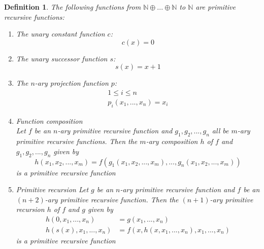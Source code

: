 \documentclass[12pt, letterpaper]{article}
\newtheorem*{definition}{Definition}
\theoremstyle{case}
\begin{document}
    \begin{definition}
      The following functions from $\mathbb{N} \oplus ... \oplus \mathbb{N}$ to $\mathbb{N}$
      are primitive recursive functions:
      \begin{enumerate}
        \item The unary constant function $c$:
        \begin{equation*}
          c(x) = 0
        \end{equation*}
        \item The unary successor function $s$:
        \begin{equation*}
          s(x) = x + 1
        \end{equation*}
        \item The $n$-ary projection function $p$:
        \begin{equation*}
          \begin{gathered}
            1 \leq i \leq n
            \\
            p_i(x_1, ..., x_n) = x_i
          \end{gathered}
        \end{equation*}
        \item Function composition \\
        Let $f$ be an $n$-ary primitive recursive function and $g_1, g_2, ..., g_n$ all be $m$-ary
        primitive recursive functions. Then the $m$-ary composition $h$ of $f$ and $g_1, g_2, ..., g_n$ given by
        \begin{equation*}
          h(x_1, x_2, ..., x_m) = f(g_1(x_1, x_2, ..., x_m), ..., g_n(x_1, x_2, ..., x_m))
        \end{equation*}
        is a primitive recursive function
        \item Primitive recursion
        Let $g$ be an $n$-ary primitive recursive function and $f$ be an $(n + 2)$-ary primitive recursive
        function. Then the $(n + 1)$-ary primitive recursion $h$ of $f$ and $g$ given by
        \begin{equation*}
          \begin{aligned}
            h(0, x_1, ..., x_n) &= g(x_1, ..., x_n)
            \\
            h(s(x), x_1, ..., x_n) &= f(x, h(x, x_1, ..., x_n), x_1, ..., x_n)
          \end{aligned}
        \end{equation*}
        is a primitive recursive function
      \end{enumerate}
    \end{definition}
  
\end{document}
